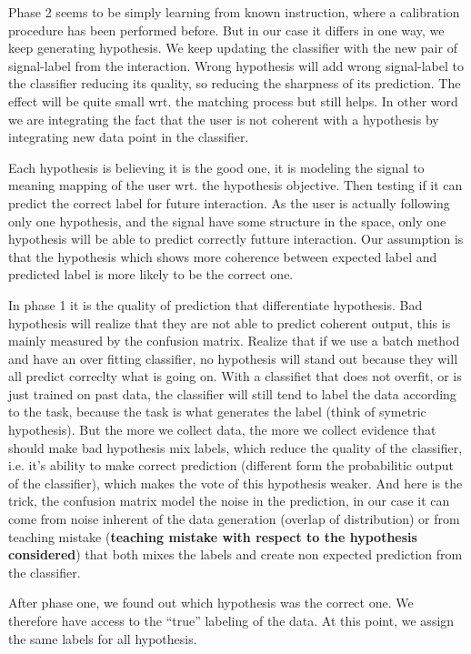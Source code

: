 Phase 2 seems to be simply learning from known instruction, where a calibration procedure has been performed before. But in our case it differs in one way, we keep generating hypothesis. We keep updating the classifier with the new pair of signal-label from the interaction. Wrong hypothesis will add wrong signal-label to the classifier reducing its quality, so reducing the sharpness of its prediction. The effect will be quite small wrt. the matching process but still helps. In other word we are integrating the fact that the user is not coherent with a hypothesis by integrating new data point in the classifier.

Each hypothesis is believing it is the good one, it is modeling the signal to meaning mapping of the user wrt. the hypothesis objective. Then testing if it can predict the correct label for future interaction. As the user is actually following only one hypothesis, and the signal have some structure in the space, only one hypothesis will be able to predict correctly futture interaction. Our assumption is that the hypothesis which shows more coherence between expected label and predicted label is more likely to be the correct one. 

In phase 1 it is the quality of prediction that differentiate hypothesis. Bad hypothesis will realize that they are not able to predict coherent output, this is mainly measured by the confusion matrix. Realize that if we use a batch method and have an over fitting classifier, no hypothesis will stand out because they will all predict correclty what is going on. With a classifiet that does not overfit, or is just trained on past data, the classifier will still tend to label the data according to the task, because the task is what generates the label (think of symetric hypothesis). But the more we collect data, the more we collect evidence that should make bad hypothesis mix labels, which reduce the quality of the classifier, i.e. it's ability to make correct prediction (different form the probabilitic output of the classifier), which makes the vote of this hypothesis weaker. And here is the trick, the confusion matrix model the noise in the prediction, in our case it can come from noise inherent of the data generation (overlap of distribution) or from teaching mistake (\textbf{teaching mistake with respect to the hypothesis considered}) that both mixes the labels and create non expected prediction from the classifier.

After phase one, we found out which hypothesis was the correct one. We therefore have access to the ``true'' labeling of the data. At this point, we assign the same labels for all hypothesis.

